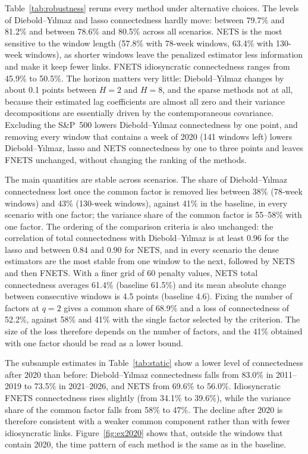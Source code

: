 Table~\ref{tab:robustness} reruns every method under alternative choices. The levels of Diebold--Y{\i}lmaz and lasso connectedness hardly move: between 79.7\% and 81.2\% and between 78.6\% and 80.5\% across all scenarios. NETS is the most sensitive to the window length (57.8\% with 78-week windows, 63.4\% with 130-week windows), as shorter windows leave the penalized estimator less information and make it keep fewer links. FNETS idiosyncratic connectedness ranges from 45.9\% to 50.5\%. The horizon matters very little: Diebold--Y{\i}lmaz changes by about 0.1 points between $H=2$ and $H=8$, and the sparse methods not at all, because their estimated lag coefficients are almost all zero and their variance decompositions are essentially driven by the contemporaneous covariance. Excluding the S\&P~500 lowers Diebold--Y{\i}lmaz connectedness by one point, and removing every window that contains a week of 2020 (141 windows left) lowers Diebold--Y{\i}lmaz, lasso and NETS connectedness by one to three points and leaves FNETS unchanged, without changing the ranking of the methods.

The main quantities are stable across scenarios. The share of Diebold--Y{\i}lmaz connectedness lost once the common factor is removed lies between 38\% (78-week windows) and 43\% (130-week windows), against 41\% in the baseline, in every scenario with one factor; the variance share of the common factor is 55--58\% with one factor. The ordering of the comparison criteria is also unchanged: the correlation of total connectedness with Diebold--Y{\i}lmaz is at least 0.96 for the lasso and between 0.84 and 0.90 for NETS, and in every scenario the dense estimators are the most stable from one window to the next, followed by NETS and then FNETS. With a finer grid of 60 penalty values, NETS total connectedness averages 61.4\% (baseline 61.5\%) and its mean absolute change between consecutive windows is 4.5 points (baseline 4.6). Fixing the number of factors at $q=2$ gives a common share of 68.9\% and a loss of connectedness of 52.2\%, against 58\% and 41\% with the single factor selected by the criterion. The size of the loss therefore depends on the number of factors, and the 41\% obtained with one factor should be read as a lower bound.

The subsample estimates in Table~\ref{tab:static} show a lower level of connectedness after 2020 than before: Diebold--Y{\i}lmaz connectedness falls from 83.0\% in 2011--2019 to 73.5\% in 2021--2026, and NETS from 69.6\% to 56.0\%. Idiosyncratic FNETS connectedness rises slightly (from 34.1\% to 39.6\%), while the variance share of the common factor falls from 58\% to 47\%. The decline after 2020 is therefore consistent with a weaker common component rather than with fewer idiosyncratic links. Figure~\ref{fig:ex2020} shows that, outside the windows that contain 2020, the time pattern of each method is the same as in the baseline.

